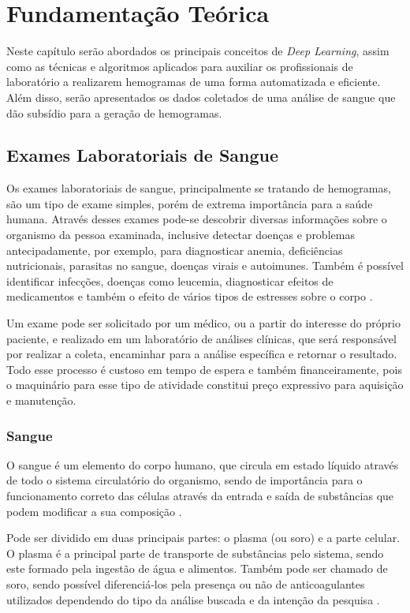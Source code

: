 \chapter{Fundamentação Teórica}
\label{chap:fund}

Neste capítulo serão abordados os principais conceitos de \emph{Deep Learning}, assim como as técnicas e algoritmos aplicados para auxiliar os profissionais de laboratório a realizarem hemogramas de uma forma automatizada e eficiente. Além disso, serão apresentados os dados coletados de uma análise de sangue que dão subsídio para a geração de hemogramas.

\section{Exames Laboratoriais de Sangue}
\label{sec:conceito1}
Os exames laboratoriais de sangue, principalmente se tratando de hemogramas, são um tipo de exame simples, porém de extrema importância para a saúde humana. Através desses exames pode-se descobrir diversas informações sobre o organismo da pessoa examinada, inclusive detectar doenças e problemas antecipadamente, por exemplo, para diagnosticar anemia, deficiências nutricionais, parasitas no sangue, doenças virais e autoimunes. Também é possível identificar infecções, doenças como leucemia, diagnosticar efeitos de medicamentos e também o efeito de vários tipos de estresses sobre o corpo \cite{abcOfCbc, atlasDeHematologiaEAnalise}.

Um exame pode ser solicitado por um médico, ou a partir do interesse do próprio paciente, e realizado em um laboratório de análises clínicas, que será responsável por realizar a coleta, encaminhar para a análise específica e retornar o resultado. Todo esse processo é custoso em tempo de espera e também financeiramente, pois o maquinário para esse tipo de atividade constitui preço expressivo para aquisição e manutenção.

\subsection{Sangue}
O sangue é um elemento do corpo humano, que circula em estado líquido através de todo o sistema circulatório do organismo, sendo de importância para o funcionamento correto das células através da entrada e saída de substâncias que podem modificar a sua composição \cite{manualHematologia}.

Pode ser dividido em duas principais partes: o plasma (ou soro) e a parte celular. O plasma é a principal parte de transporte de substâncias pelo sistema, sendo este formado pela ingestão de água e alimentos. Também pode ser chamado de soro, sendo possível diferenciá-los pela presença ou não de anticoagulantes utilizados dependendo do tipo da análise buscada e da intenção da pesquisa \cite{manualHematologia}.

